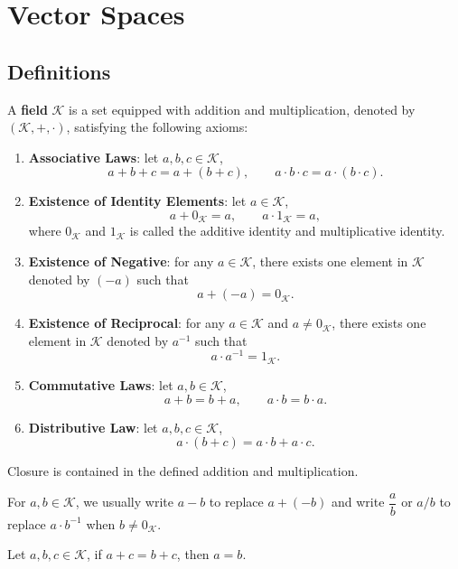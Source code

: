 \chapter{Vector Spaces}
\section{Definitions}
\begin{definitionenv}
		A \textbf{field} $\mathcal{K}$ is a set equipped with addition and multiplication, denoted by $(\mathcal{K},+,\cdot)$, satisfying the following axioms:
		\begin{enumerate}
			\item \textbf{Associative Laws}: let $a,b,c \in \mathcal{K}$, $$a+b+c=a+(b+c), \qquad a\cdot b\cdot c=a\cdot (b\cdot c).$$
			\item \textbf{Existence of Identity Elements}: let $a\in \mathcal K$, $$a+0_{\mathcal{K}}=a,\qquad a\cdot 1_{\mathcal{K}}=a,$$ where $0_{\mathcal{K}}$ and $1_\mathcal{K}$ is called the additive identity and multiplicative identity.
			\item \textbf{Existence of Negative}: for any $a\in \mathcal{K}$, there exists one element in $\mathcal{K}$ denoted by $(-a)$ such that $$a+(-a)=0_\mathcal{K}.$$
			\item \textbf{Existence of Reciprocal}: for any $a\in \mathcal{K}$ and $a\neq 0_\mathcal{K}$, there exists one element in $\mathcal{K}$ denoted by $a^{-1}$ such that $$a\cdot a^{-1} = 1_\mathcal{K}.$$ 
			\item \textbf{Commutative Laws}: let $ a,b\in \mathcal{K}$, $$a+b=b+a, \qquad a\cdot b=b\cdot a.$$
			\item \textbf{Distributive Law}: let $a,b,c \in \mathcal{K}$, $$a\cdot (b+c)=a\cdot b + a\cdot c.$$
		\end{enumerate}
	\end{definitionenv}	
	\begin{remarkenv}
		Closure is contained in the defined addition and multiplication.
	\end{remarkenv}
    \begin{notationenv}
        For $a,b \in \mathcal{K}$, we usually write $a-b$ to replace $a+(-b)$ and write $\dfrac{a}{b}$ or $a/b$ to replace $a\cdot b^{-1}$ when $b\neq 0_\mathcal{K}$.
    \end{notationenv}
	\begin{theoremenv}
		Let $a,b,c \in \mathcal{K}$, if $a+c=b+c$, then $a=b$.
	\end{theoremenv}
